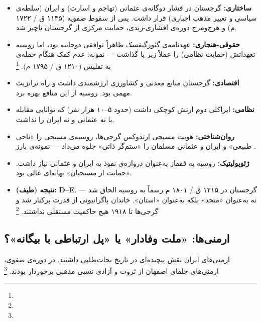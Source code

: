 \begin{tcolorbox}[casebox, title={تحلیل شش‌وجهی: نجات‌طلبی گرجی‌ها (۱۷۸۳)}]
\begin{itemize}[nosep, rightmargin=1em]
  \item \textbf{ساختاری:} گرجستان در فشار دوگانه‌ی عثمانی (تهاجم و اسارت) و ایران (سلطه‌ی سیاسی و تغییر مذهب اجباری) قرار داشت. پس از سقوط صفویه (۱۱۳۵ ق / ۱۷۲۲ م) و هرج‌ومرج دوره‌ی افشاری-زندی، حمایت مرکزی از گرجستان ناچیز شد.
  \item \textbf{حقوقی-هنجاری:} عهدنامه‌ی گئورگیفسک ظاهراً توافقی دوجانبه بود، اما روسیه تعهداتش (حمایت نظامی) را عملاً زیر پا گذاشت — نمونه: عدم کمک هنگام حمله‌ی  به تفلیس (۱۲۱۰ ق / ۱۷۹۵ م).%
  \footnote{}
  \item \textbf{اقتصادی:} گرجستان منابع معدنی و کشاورزی ارزشمندی داشت و راه ترانزیت مهمی بود. روسیه از این منافع بهره برد.
  \item \textbf{نظامی:} ایراکلی دوم ارتش کوچکی داشت (حدود ۵–۱۰ هزار نفر) که توانایی مقابله با نه عثمانی و نه ایران را نداشت.
  \item \textbf{روان‌شناختی:} هویت مسیحی ارتدوکس گرجی‌ها، روسیه‌ی مسیحی را «ناجی طبیعی» و ایران و عثمانی مسلمان را «ستم‌گر ذاتی» جلوه می‌داد — نمونه‌ی بارز .
  \item \textbf{ژئوپولیتیک:} روسیه به قفقاز به‌عنوان دروازه‌ی نفوذ به ایران و عثمانی نیاز داشت. «حمایت از مسیحیان» بهانه‌ای عالی بود.
  \item \textbf{نتیجه (طیف):} \textbf{D–E}. گرجستان در ۱۲۱۵ ق / ۱۸۰۱ م رسماً به روسیه الحاق شد — نه به‌عنوان «متحد» بلکه به‌عنوان «استان». خاندان باگراتیونی از قدرت برکنار شد و گرجی‌ها تا ۱۹۱۸ هیچ حاکمیت مستقلی نداشتند.%
  \footnote{}
\end{itemize}
\end{tcolorbox}

\subsection{ارمنی‌ها: «ملت وفادار» یا «پل ارتباطی با بیگانه»؟}
\label{subsec:ch06-armenians}

ارمنی‌های ایران نقش پیچیده‌ای در تاریخ نجات‌طلبی داشتند. در دوره‌ی صفوی، ارمنی‌های جلفای اصفهان از ثروت و آزادی نسبی مذهبی برخوردار بودند.%
\footnote{}

